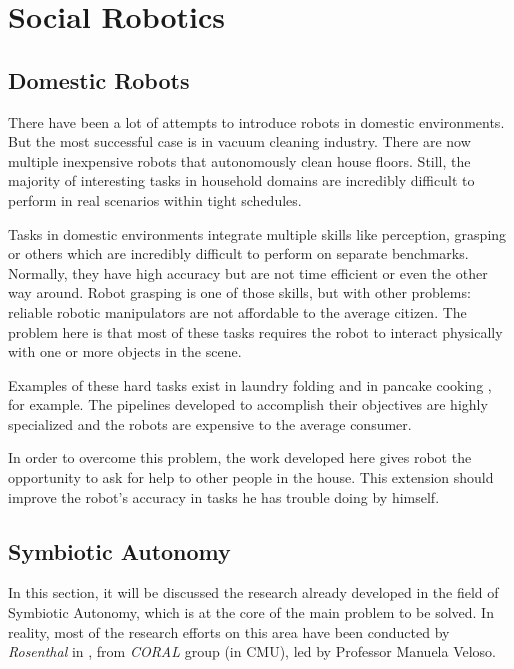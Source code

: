\section{Social Robotics}

\subsection{Domestic Robots}
\label{sec:dom_robots}

There have been a lot of attempts to introduce robots in domestic environments.
But the most successful case is in vacuum cleaning industry. There are now
multiple inexpensive robots that autonomously clean house floors. Still, the
majority of interesting tasks in household domains are incredibly difficult to
perform in real scenarios within tight schedules.

Tasks in domestic environments integrate multiple skills like perception,
grasping or others which are incredibly difficult to perform on separate benchmarks.
Normally, they have high accuracy but are not time efficient or even the other way around.
Robot grasping is one of those skills, but with other problems: reliable robotic
manipulators are not affordable to the average citizen. The problem here is that
most of these tasks requires the robot to interact physically with one or more
objects in the scene.

Examples of these hard tasks exist in laundry folding \cite{miller2012geometric}
and in pancake cooking \cite{beetz2011robotic}, for example. The pipelines
developed to accomplish their objectives are highly specialized and the robots
are expensive to the average consumer.

In order to overcome this problem, the work developed here gives robot the
opportunity to ask for help to other people in the house. This extension should
improve the robot's accuracy in tasks he has trouble doing by himself.


\subsection{Symbiotic Autonomy}

In this section, it will be discussed the research already developed in the field
of Symbiotic Autonomy, which is at the core of the main problem to be
solved. In reality, most of the research efforts on this area have been
conducted by \textit{Rosenthal} in \cite{rosenthal2010effective}, from
\textit{CORAL} group (in \gls{CMU}), led by Professor Manuela Veloso.


